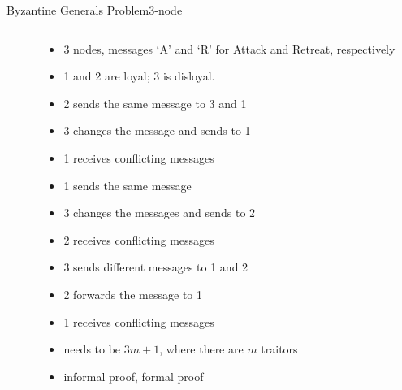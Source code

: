 \documentclass[pdf,table]{beamer}
\begin{document}
\begin{frame}{Byzantine Generals Problem}{3-node}
	\begin{columns}[T]
		\begin{column}{0.48\textwidth}
		\end{column}
		\begin{column}{0.49\textwidth}
			\begin{itemize}
				\item <-2> 3 nodes, messages `A' and `R' for Attack and Retreat, respectively
				\item <2-> 1 and 2 are loyal; 3 is disloyal. 
				\item <2|only@2> 2 sends the same message to 3 and 1
				\item <2|only@2> 3 changes the message and sends to 1
				\item <2|only@2> 1 receives conflicting messages
				\item <3|only@3> 1 sends the same message
				\item <3|only@3> 3 changes the messages and sends to 2
				\item <3|only@3> 2 receives conflicting messages
				\item <4|only@4> 3 sends different messages to 1 and 2
				\item <4|only@4> 2 forwards the message to 1
				\item <4|only@4> 1 receives conflicting messages
				\item <4-> needs to be $3m+1$, where there are $m$ traitors
				\item <4-> informal proof, formal proof \cite{pease1980reaching}

			\end{itemize}
		\end{column}
	\end{columns}
\end{frame}
\end{document}
